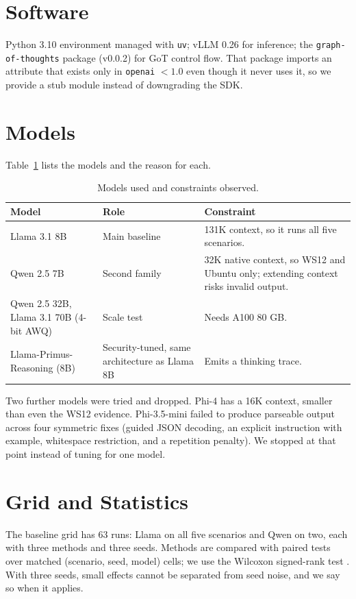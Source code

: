 \documentclass[a4paper, 12pt]{report}
\theoremstyle{definition}
\begin{document}
\section{Software}
Python 3.10 environment managed with \texttt{uv}; vLLM 0.26 for inference; the \texttt{graph-of-thoughts} package (v0.0.2) for GoT control flow. That package imports an attribute that exists only in \texttt{openai} $<1.0$ even though it never uses it, so we provide a stub module instead of downgrading the SDK.

\section{Models}
Table~\ref{tab:models} lists the models and the reason for each.

\begin{table}[h]
\centering
\caption{Models used and constraints observed.}
\label{tab:models}
\begin{tabular}{p{3.6cm}p{4.2cm}p{6cm}}
\toprule
Model & Role & Constraint \\
\midrule
Llama 3.1 8B & Main baseline & 131K context, so it runs all five scenarios. \\
Qwen 2.5 7B & Second family & 32K native context, so WS12 and Ubuntu only; extending context risks invalid output. \\
Qwen 2.5 32B, Llama 3.1 70B (4-bit AWQ) & Scale test & Needs A100 80 GB. \\
Llama-Primus-Reasoning (8B) & Security-tuned, same architecture as Llama 8B & Emits a thinking trace. \\
\bottomrule
\end{tabular}
\end{table}

Two further models were tried and dropped. Phi-4 has a 16K context, smaller than even the WS12 evidence. Phi-3.5-mini failed to produce parseable output across four symmetric fixes (guided JSON decoding, an explicit instruction with example, whitespace restriction, and a repetition penalty). We stopped at that point instead of tuning for one model.

\section{Grid and Statistics}
The baseline grid has 63 runs: Llama on all five scenarios and Qwen on two, each with three methods and three seeds. Methods are compared with paired tests over matched (scenario, seed, model) cells; we use the Wilcoxon signed-rank test \cite{wilcoxon1945}. With three seeds, small effects cannot be separated from seed noise, and we say so when it applies.
\end{document}
